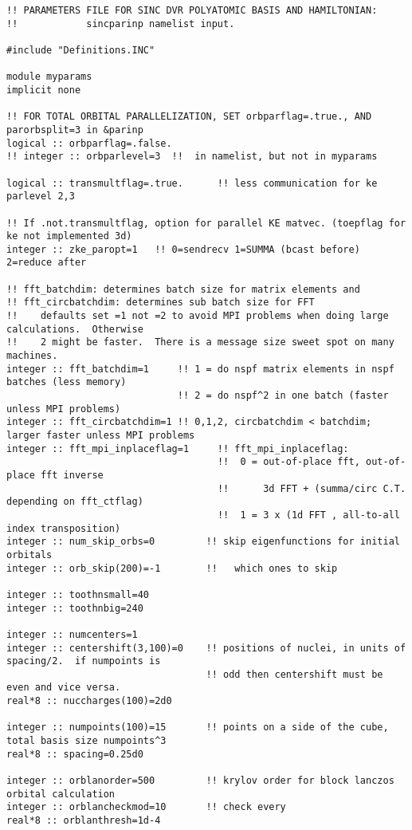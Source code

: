 \begin{verbatim}
!! PARAMETERS FILE FOR SINC DVR POLYATOMIC BASIS AND HAMILTONIAN:
!!            sincparinp namelist input.

#include "Definitions.INC"

module myparams
implicit none

!! FOR TOTAL ORBITAL PARALLELIZATION, SET orbparflag=.true., AND parorbsplit=3 in &parinp
logical :: orbparflag=.false.
!! integer :: orbparlevel=3  !!  in namelist, but not in myparams

logical :: transmultflag=.true.      !! less communication for ke parlevel 2,3

!! If .not.transmultflag, option for parallel KE matvec. (toepflag for ke not implemented 3d)
integer :: zke_paropt=1   !! 0=sendrecv 1=SUMMA (bcast before) 2=reduce after

!! fft_batchdim: determines batch size for matrix elements and 
!! fft_circbatchdim: determines sub batch size for FFT 
!!    defaults set =1 not =2 to avoid MPI problems when doing large calculations.  Otherwise 
!!    2 might be faster.  There is a message size sweet spot on many machines.
integer :: fft_batchdim=1     !! 1 = do nspf matrix elements in nspf batches (less memory)
                              !! 2 = do nspf^2 in one batch (faster unless MPI problems)
integer :: fft_circbatchdim=1 !! 0,1,2, circbatchdim < batchdim; larger faster unless MPI problems
integer :: fft_mpi_inplaceflag=1     !! fft_mpi_inplaceflag:
                                     !!  0 = out-of-place fft, out-of-place fft inverse
                                     !!      3d FFT + (summa/circ C.T. depending on fft_ctflag)
                                     !!  1 = 3 x (1d FFT , all-to-all index transposition)
integer :: num_skip_orbs=0         !! skip eigenfunctions for initial orbitals
integer :: orb_skip(200)=-1        !!   which ones to skip

integer :: toothnsmall=40
integer :: toothnbig=240

integer :: numcenters=1
integer :: centershift(3,100)=0    !! positions of nuclei, in units of spacing/2.  if numpoints is
                                   !! odd then centershift must be even and vice versa.
real*8 :: nuccharges(100)=2d0

integer :: numpoints(100)=15       !! points on a side of the cube, total basis size numpoints^3
real*8 :: spacing=0.25d0

integer :: orblanorder=500         !! krylov order for block lanczos orbital calculation
integer :: orblancheckmod=10       !! check every
real*8 :: orblanthresh=1d-4


\end{verbatim}
